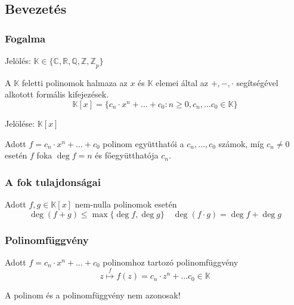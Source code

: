 \setcounter{definition}{0}
\setcounter{theorem}{0}
\subsection{Bevezetés}
\subsubsection{Fogalma}
\begin{remark*}
	Jelölés: $\mathbb{K} \in \{ \mathbb{C, R, Q, Z, Z}_p \}$
\end{remark*}
\begin{definition}
	A $\mathbb{K}$ feletti polinomok halmaza az $x$ és $\mathbb{K}$ elemei által
	az $+, -, \cdot$ segítségével alkotott formális kifejezések.
	\begin{equation*}
		\mathbb{K}[x] = \{
			c_n \cdot x^n + \dots + c_0: n \geq 0, c_n, \dots c_0 \in \mathbb{K}
		\}
	\end{equation*}
\end{definition}
\begin{remark*}
	Jelölése: $\mathbb{K}[x]$
\end{remark*}
\begin{definition}
	Adott $f = c_n \cdot x^n + \dots + c_0$ polinom
	együtthatói a $c_n, \dots, c_0$ számok, míg $c_n \neq 0$ esetén
	$f$ foka $\deg f = n$ és főegyütthatója $c_n$.
\end{definition}
\subsubsection{A fok tulajdonságai}
\begin{theorem}
	Adott $f, g \in \mathbb{K}[x]$ nem-nulla polinomok esetén
	\begin{equation*}
		\deg(f + g) \leq \max\{ \deg f, \deg g \} \quad
		\deg(f \cdot g) = \deg f + \deg g
	\end{equation*}
\end{theorem}
\subsubsection{Polinomfüggvény}
\begin{definition}
	Adott $f = c_n \cdot x^n + \dots + c_0$ polinomhoz tartozó polinomfüggvény
	\begin{equation*}
		z \overset{f}{\mapsto} f(z) = c_n \cdot z^n + \dots c_0 \in \mathbb{K}
	\end{equation*}
\end{definition}
\begin{remark*}
	A polinom és a polinomfüggvény nem azonosak!
\end{remark*}
